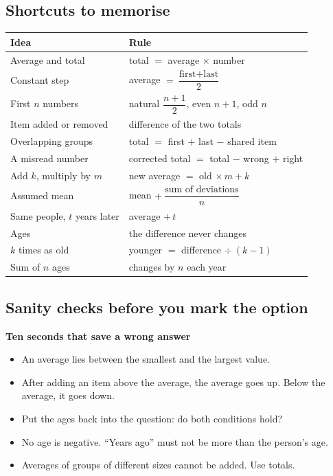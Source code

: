 \documentclass[11pt,a4paper]{article}
\let\oldsubsection\subsection
\renewcommand{\subsection}{\needspace{9\baselineskip}\oldsubsection}
\newcommand{\infobox}[2]{\par\medskip\noindent\begingroup\setlength{\fboxsep}{7pt}%
  \colorbox{codebg}{\parbox{\dimexpr\linewidth-14pt\relax}{\textbf{\color{ember}#1}\par\smallskip #2}}\endgroup\par\medskip}
\begin{document}
\subsection*{Shortcuts to memorise}
\begin{center}\small\renewcommand{\arraystretch}{1.9}\setlength{\tabcolsep}{8pt}
\begin{tabularx}{\linewidth}{@{}>{\raggedright\arraybackslash}X>{\raggedright\arraybackslash}X@{}}
\toprule
\textbf{\color{slate}Idea} & \textbf{\color{slate}Rule} \\ \midrule
Average and total & total $=$ average $\times$ number \\
Constant step & average $=\dfrac{\text{first}+\text{last}}{2}$ \\
First $n$ numbers & natural $\dfrac{n+1}{2}$, even $n+1$, odd $n$ \\
Item added or removed & difference of the two totals \\
Overlapping groups & total $=$ first $+$ last $-$ shared item \\
A misread number & corrected total $=$ total $-$ wrong $+$ right \\
Add $k$, multiply by $m$ & new average $=$ old $\times\,m + k$ \\
Assumed mean & mean $+\ \dfrac{\text{sum of deviations}}{n}$ \\
Same people, $t$ years later & average $+\,t$ \\
Ages & the difference never changes \\
$k$ times as old & younger $=$ difference $\div\ (k-1)$ \\
Sum of $n$ ages & changes by $n$ each year \\
\bottomrule
\end{tabularx}\end{center}

\subsection*{Sanity checks before you mark the option}
\infobox{Ten seconds that save a wrong answer}{
\begin{itemize}
\item An average lies between the smallest and the largest value.
\item After adding an item above the average, the average goes up. Below the average, it goes down.
\item Put the ages back into the question: do both conditions hold?
\item No age is negative. ``Years ago'' must not be more than the person's age.
\item Averages of groups of different sizes cannot be added. Use totals.
\end{itemize}}
\end{document}
